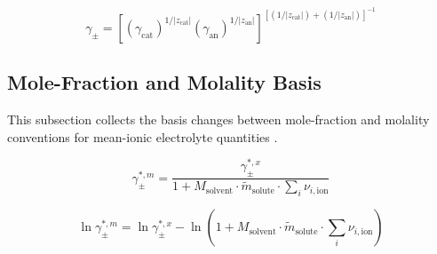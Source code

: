 \documentclass[12pt, letterpaper]{article}
\begin{document}

\begin{equation}
    \gamma_{\pm}
    =
    \left[
        \left(\gamma_{\mathrm{cat}}\right)^{1/|z_{\mathrm{cat}}|}
        \left(\gamma_{\mathrm{an}}\right)^{1/|z_{\mathrm{an}}|}
    \right]^{\!\left[\left(1/|z_{\mathrm{cat}}|\right)+\left(1/|z_{\mathrm{an}}|\right)\right]^{-1}}
    \label{eq:gamma_pm_charge}
\end{equation}

\subsection{Mole-Fraction and Molality Basis}

This subsection collects the basis changes between mole-fraction and molality conventions for mean-ionic electrolyte quantities \cite{Figiel2025}.


\begin{equation}
    \gamma_{\pm}^{*,m}
    =
    \frac{\gamma_{\pm}^{*,x}}{1+M_{\mathrm{solvent}}\cdot\tilde{m}_{\mathrm{solute}}\cdot\sum_{i}\nu_{i,\mathrm{ion}}}
    \label{eq:gamma_pm_molality}
\end{equation}


\begin{equation}
    \ln\gamma_{\pm}^{*,m}
    =
    \ln\gamma_{\pm}^{*,x}
    -
    \ln\left(1+M_{\mathrm{solvent}}\cdot\tilde{m}_{\mathrm{solute}}\cdot\sum_{i}\nu_{i,\mathrm{ion}}\right)
    \label{eq:lngamma_pm_molality}
\end{equation}
\end{document}
